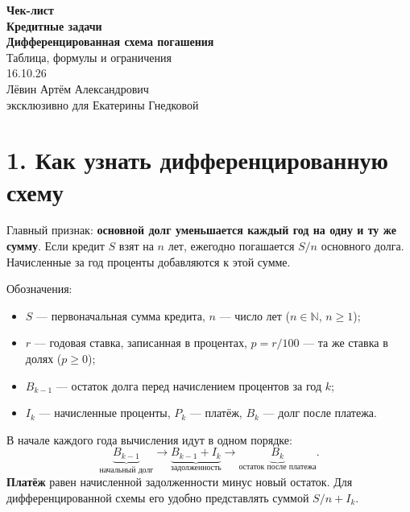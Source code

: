 \documentclass[a4paper,12pt]{article}
\newcommand{\key}[1]{\textcolor{darkaccent}{\textbf{#1}}}
\begin{document}
\thispagestyle{empty}
\begin{center}
\vspace*{27mm}
{\Large\textcolor{accent}{\textbf{Чек-лист}}}\\[11mm]
{\Huge\textbf{Кредитные задачи}}\\[8mm]
{\Large\textbf{Дифференцированная схема погашения}}\\[5mm]
{\large Таблица, формулы и ограничения}\\[22mm]
{\large 16.10.26}\\[27mm]
{\large Лёвин Артём Александрович}\\[4mm]
{\large\textcolor{darkaccent}{эксклюзивно для Екатерины Гнедковой}}
\end{center}
\vfill
\begin{center}
\end{center}
\clearpage

\section*{1. Как узнать дифференцированную схему}

Главный признак: \key{основной долг уменьшается каждый год на одну и ту же сумму}. Если кредит $S$ взят на $n$ лет, ежегодно погашается $S/n$ основного долга. Начисленные за год проценты добавляются к этой сумме.

Обозначения:
\begin{itemize}
\item $S$ --- первоначальная сумма кредита, $n$ --- число лет ($n\in\mathbb N$, $n\ge1$);
\item $r$ --- годовая ставка, записанная в процентах, $p=r/100$ --- та же ставка в долях ($p\ge0$);
\item $B_{k-1}$ --- остаток долга перед начислением процентов за год $k$;
\item $I_k$ --- начисленные проценты, $P_k$ --- платёж, $B_k$ --- долг после платежа.
\end{itemize}

В начале каждого года вычисления идут в одном порядке:
\[
\underbrace{B_{k-1}}_{\text{начальный долг}}
\longrightarrow\underbrace{B_{k-1}+I_k}_{\text{задолженность}}
\longrightarrow\underbrace{B_k}_{\text{остаток после платежа}}.
\]
\key{Платёж} равен начисленной задолженности минус новый остаток. Для дифференцированной схемы его удобно представлять суммой $S/n+I_k$.
\end{document}
